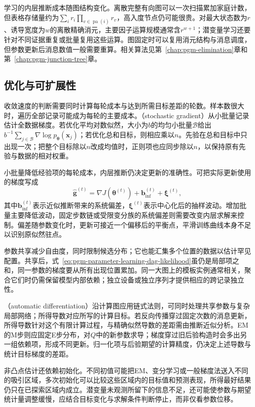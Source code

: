 学习的内层推断成本随图结构变化。离散完整有向图可以一次扫描累加家庭计数，但表格存储量约为$\sum_i r_i\prod_{v\in\operatorname{pa}(i)}r_v$，高入度节点仍可能很贵。对最大状态数为$r$、诱导宽度为$w$的离散精确消元，主要因子运算规模通常含$r^{w+1}$；潜变量学习还要针对不同证据重复或批量复用这些运算。图固定时可以复用消元结构与消息调度，但参数更新后消息数值一般需要重算。相关算法见第~\ref{chap:pgm-elimination}章和第~\ref{chap:pgm-junction-tree}章。

\subsection{优化与可扩展性}
\label{sec:pgm-parameter-learning-scalability}

收敛速度的判断需要同时计算每轮成本与达到所需目标差距的轮数。样本数很大时，遍历全部记录可能成为每轮的主要成本。（stochastic gradient）从小批量记录估计全数据梯度。若优化平均对数似然，大小为$b$的均匀小批量$\mathcal{B}$给出$b^{-1}\sum_{j\in\mathcal{B}}\nabla\log p_{\bm{\theta}}(\bm{x}_j)$；若优化总和目标，则相应乘以$n$。先验在总和目标中只出现一次；把整个目标除以$n$改成均值时，正则项也应同步除以$n$，以保持原有先验与数据的相对权重。

小批量降低经验项的每轮成本，内层推断仍决定更新的准确性。可把实际更新使用的梯度写成
\[
  \widehat{\bm{g}}^{(t)}
   =\nabla J(\bm{\theta}^{(t)})
      +\bm{b}_{\mathrm{inf}}^{(t)}
      +\bm{\xi}^{(t)},
\]
其中$\bm{b}_{\mathrm{inf}}^{(t)}$表示近似推断带来的系统偏差，$\bm{\xi}^{(t)}$表示中心化后的抽样波动。增加批量主要降低波动，固定步数链或受限变分族的系统偏差则需要改变内层求解来控制。偏差随参数变化时，更新可接近一个偏移后的平衡点，平滑训练曲线本身不足以识别原似然驻点。

参数共享减少自由度，同时限制候选分布；它也能汇集多个位置的数据以估计罕见配置。共享后，式~\eqref{eq:pgm-parameter-learning-dag-likelihood}虽仍是局部项之和，同一参数的梯度要从所有出现位置累加。同一大图上的模板实例通常相关，聚合它们时仍需保留模型内部依赖；独立设备或独立序列才提供相应的跨记录独立性。

（automatic differentiation）沿计算图应用链式法则，可同时处理共享参数与复杂局部网络；所得导数对应所写的计算目标。若反向传播穿过固定次数的消息更新，所得导数针对这个有限计算过程，与精确似然导数的差距需由推断近似分析。EM的M步则应固定E步分布，对$Q$中的新参数求导；梯度穿过旧后验构造时会多出另一组依赖项，形成不同更新。归一化项与后验期望的计算精度，仍决定上述导数与统计目标梯度的差距。

非凸点估计还依赖初始化。不同初值可能把EM、变分学习或一般梯度法送入不同的吸引区域，多次初始化可以比较这些区域内的目标值和预测表现，所得最好结果仍只在已探索区域内成立。潜变量未观测所留下的信息不足，还可能使参数与期望统计量调整缓慢，应结合目标变化与求解条件判断停止，而非仅看参数位移。

